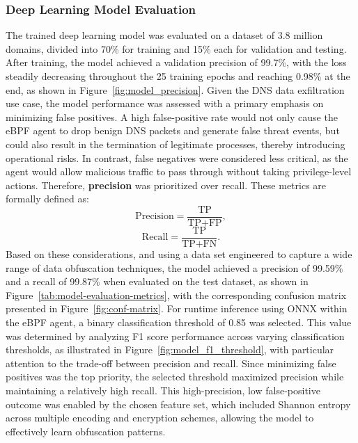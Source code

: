 \documentclass [11pt, proquest] {uwthesis}[2020/02/24]
\begin{document}
\subsubsection{Deep Learning Model Evaluation}
The trained deep learning model was evaluated on a dataset of 3.8 million domains, divided into 70\% for training and 15\% each for validation and testing. After training, the model achieved a validation precision of 99.7\%, with the loss steadily decreasing throughout the 25 training epochs and reaching 0.98\% at the end, as shown in Figure~\ref{fig:model_precision}. Given the DNS data exfiltration use case, the model performance was assessed with a primary emphasis on minimizing false positives. A high false-positive rate would not only cause the eBPF agent to drop benign DNS packets and generate false threat events, but could also result in the termination of legitimate processes, thereby introducing operational risks. In contrast, false negatives were considered less critical, as the agent would allow malicious traffic to pass through without taking privilege-level actions. Therefore, \textbf{precision} was prioritized over recall. These metrics are formally defined as:
\[
\text{Precision} = \frac{\text{TP}}{\text{TP} + \text{FP}},
\]
\[
\text{Recall} = \frac{\text{TP}}{\text{TP} + \text{FN}}.
\]
Based on these considerations, and using a data set engineered to capture a wide range of data obfuscation techniques, the model achieved a precision of 99.59\% and a recall of 99.87\% when evaluated on the test dataset, as shown in Figure~\ref{tab:model-evaluation-metrics}, with the corresponding confusion matrix presented in Figure~\ref{fig:conf-matrix}.
For runtime inference using ONNX within the eBPF agent, a binary classification threshold of 0.85 was selected. This value was determined by analyzing F1 score performance across varying classification thresholds, as illustrated in Figure~\ref{fig:model_f1_threshold}, with particular attention to the trade-off between precision and recall. Since minimizing false positives was the top priority, the selected threshold maximized precision while maintaining a relatively high recall.
This high-precision, low false-positive outcome was enabled by the chosen feature set, which included Shannon entropy across multiple encoding and encryption schemes, allowing the model to effectively learn obfuscation patterns.




\end{document}
